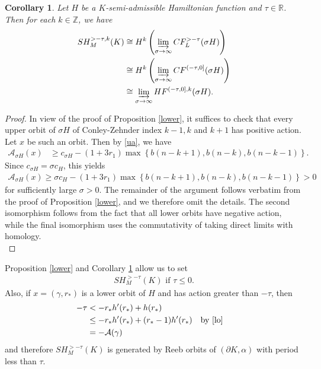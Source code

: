 \documentclass[12pt]{amsart}
\newtheorem{corollary}[theorem]{Corollary}
\theoremstyle{definition}
\newcommand{\RR}{{\mathbb R}}
\newcommand{\ZZ}{{\mathbb Z}}
\begin{document}
\begin{corollary}\label{cor3}
    Let $H$ be a $K$-semi-admissible Hamiltonian function and $\tau \in \RR $. Then for each $k \in \ZZ$, we have
    \begin{align*}
        SH^{>- \tau,k}_M(K) &\cong H^k \left(  \varinjlim_{\sigma \to \infty} CF^{>- \tau}_{L}(\sigma H) \right)\\
        &\cong H^k \left( \varinjlim_{\sigma \to \infty} CF^{(-\tau,0]}(\sigma H)  \right)\\& \cong \varinjlim_{\sigma \to \infty} HF^{(-\tau,0],k}(\sigma H).
    \end{align*}
\end{corollary}
\begin{proof}
In view of the proof of Proposition \ref{lower}, it suffices to check that every upper orbit of $\sigma H$ of Conley-Zehnder index $k-1,k$ and $k+1$ has positive action. Let $x$ be such an orbit. Then by \eqref{ua}, we have
\begin{align*}
    \mathcal{A}_{\sigma H}(x) &\geq c_{\sigma H} - (1+3r_1) \max\left\{b(n-k+1),b(n-k),b(n-k-1)\right\}.
\end{align*}
Since $c_{\sigma H} = \sigma c_H$, this yields
\begin{align*}
    \mathcal{A}_{\sigma H}(x) \geq \sigma c_{H} - (1+3r_1) \max\left\{b(n-k+1),b(n-k),b(n-k-1)\right\}>0
\end{align*}
for sufficiently large $\sigma >0$. The remainder of the argument follows verbatim from the proof of Proposition \ref{lower}, and we therefore omit the details. The second isomorphism follows from the fact that all lower orbits have negative action, while the final isomorphism uses the commutativity of taking direct limits with homology.\\
\end{proof}
Proposition \ref{lower} and Corollary \ref{cor3} allow us to set
    \begin{align*}
        SH^{> -\tau}_M(K)\,\,\textrm{if}\,\,\tau \leq 0.
    \end{align*}
    Also, if $x=(\gamma,r_*)$ is a lower orbit of $H$ and has action greater than $-\tau$, then 
    \begin{align*}
        -\tau &< -r_* h'(r_*) +h(r_*)\\
        &\leq -r_* h'(r_*) +(r_* -1) h'(r_*)&&\textrm{by \eqref{lo}}\\
        &=- \mathcal{A}(\gamma)
    \end{align*}
    and therefore $SH^{> -\tau}_M(K)$ is generated by Reeb orbits of $(\partial K, \alpha)$ with period less than $\tau$.
\end{document}
